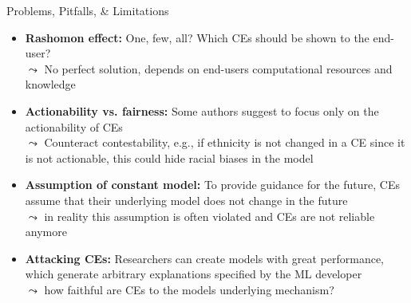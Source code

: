 \documentclass[10pt,compress,t,notes=noshow, xcolor=table]{beamer}
\begin{document}
\begin{frame}{Problems, Pitfalls, \& Limitations}
\begin{itemize}[<+->]
    \item \textbf{Rashomon effect:} One, few, all? Which CEs should be shown to the end-user?\\
    $\leadsto$ No perfect solution, depends on end-users computational resources and knowledge
    \item \textbf{Actionability vs. fairness:} Some authors suggest to focus only on the actionability of CEs\\
    $\leadsto$ Counteract contestability, e.g., if ethnicity is not changed in a CE since it is not actionable, this could hide racial biases in the model
    \item \textbf{Assumption of constant model:} To provide guidance for the future, CEs assume that their underlying model does not change in the future\\
    $\leadsto$ in reality this assumption is often violated and CEs are not reliable anymore 
    \item \textbf{Attacking CEs:} Researchers can create models with great performance, which generate arbitrary explanations specified by the ML developer\\
    $\leadsto$ how faithful are CEs to the models underlying mechanism?
\end{itemize}

\end{frame}

\endlecture
\end{document}
